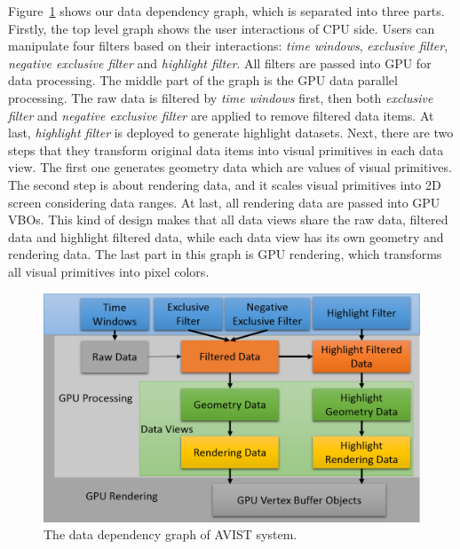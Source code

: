 \documentclass[journal]{vgtc}                %
\begin{document}
{Figure~\ref{fig:datagraph} shows our data dependency graph, which is separated into three parts. Firstly, the top level graph shows the user interactions of CPU side. Users can manipulate four filters based on their interactions: \emph{time windows}, \emph{exclusive filter}, \emph{negative exclusive filter} and \emph{highlight filter}. All filters are passed into GPU  for data processing. The middle part of the graph is the GPU data parallel processing. The raw data is filtered by \emph{time windows} first, then both \emph{exclusive filter} and \emph{negative exclusive filter} are applied to remove filtered data items. At last, \emph{highlight filter} is deployed to generate highlight datasets. Next, there are two steps that they transform original data items into visual primitives in each data view. The first one generates geometry data which are values of visual primitives. The second step is about rendering data, and it scales visual primitives into 2D screen considering data ranges. At last, all rendering data are passed into GPU VBOs. This kind of design makes that all data views share the raw data, filtered data and highlight filtered data, while each data view has its own geometry and rendering data. The last part in this graph is GPU rendering, which transforms all visual primitives into pixel colors.  

 \begin{figure}[htb]
 	\centering
 	\includegraphics[width=1.0\linewidth]{pic/graph.png}
 	\parbox[t]{1.0\columnwidth}{\relax
 	}
 	\caption{\label{fig:datagraph} The data dependency graph of AVIST system.}
 \end{figure} 
 
}
\end{document}
